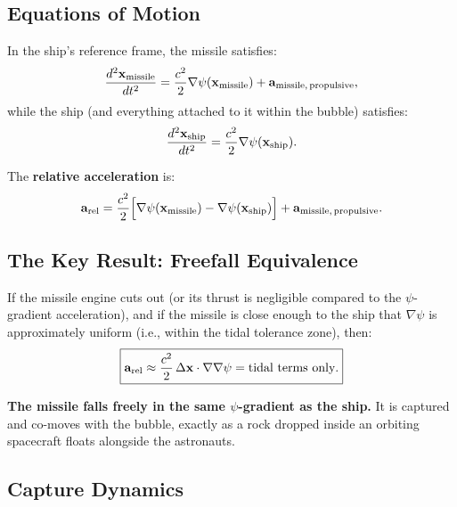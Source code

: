 \documentclass[12pt,aps,prd,superscriptaddress,nofootinbib]{revtex4-2}
\begin{document}
\subsection{Equations of Motion}

In the ship's reference frame, the missile satisfies:
\begin{equation}
\frac{d^2\mathbf{x}_{\rm missile}}{dt^2}
= \frac{c^2}{2}\nabla\psi(\mathbf{x}_{\rm missile})
+ \mathbf{a}_{\rm missile,\,propulsive},
\end{equation}
while the ship (and everything attached to it within the bubble)
satisfies:
\begin{equation}
\frac{d^2\mathbf{x}_{\rm ship}}{dt^2}
= \frac{c^2}{2}\nabla\psi(\mathbf{x}_{\rm ship}).
\end{equation}

The \textbf{relative acceleration} is:
\begin{equation}
\mathbf{a}_{\rm rel} = \frac{c^2}{2}\Big[
  \nabla\psi(\mathbf{x}_{\rm missile})
  - \nabla\psi(\mathbf{x}_{\rm ship})\Big]
  + \mathbf{a}_{\rm missile,\,propulsive}.
\end{equation}

\subsection{The Key Result: Freefall Equivalence}

If the missile engine cuts out (or its thrust is negligible compared
to the $\psi$-gradient acceleration), and if the missile is close
enough to the ship that $\nabla\psi$ is approximately uniform
(i.e., within the tidal tolerance zone), then:
\begin{equation}
\boxed{\mathbf{a}_{\rm rel} \approx \frac{c^2}{2}\,
  \Delta\mathbf{x}\cdot\nabla\nabla\psi = \text{tidal terms only}.}
\label{eq:freefall}
\end{equation}

\textbf{The missile falls freely in the same $\psi$-gradient as
the ship.} It is captured and co-moves with the bubble, exactly as
a rock dropped inside an orbiting spacecraft floats alongside
the astronauts.

\subsection{Capture Dynamics}
\end{document}
